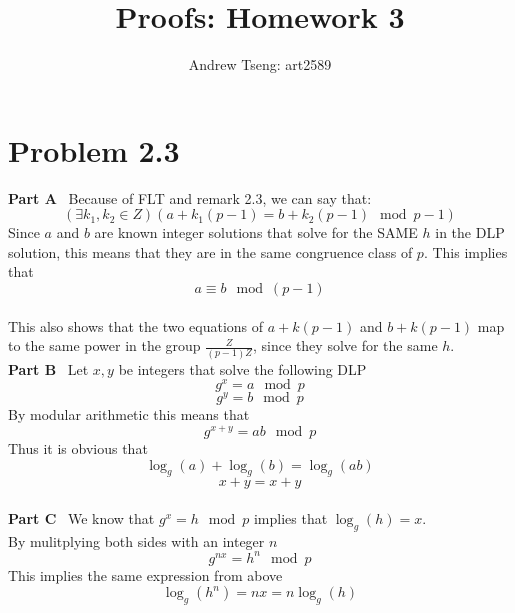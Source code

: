 \documentclass[10pt]{amsart}
\title{Proofs: Homework 3}
\author{Andrew Tseng: art2589}
\begin{document}
\maketitle
\thispagestyle{empty}

\section*{\large \textbf{Problem 2.3}}
\begin{addmargin}{5pt}
\textbf{\small Part A} \
Because of FLT and remark 2.3, we can say that:
\[(\exists k_{1},k_{2} \in Z)(a + k_{1}(p-1) = b + k_{2}(p-1) \mod p-1) \]
Since $a$ and $b$ are known integer solutions that solve for the SAME $h$ in
the DLP solution, this means that they are in the same congruence class of $p$. 
This implies that
\[a \equiv b \mod (p-1)\]
\\
This also shows that the two equations of $a + k(p-1)$ and $b + k(p-1)$ map to
the same power in the group $\frac{Z}{(p-1)Z}$,
since they solve for the same $h$. \\

\noindent \textbf{\small Part B} \
Let $x,y$ be integers that solve the following DLP
\[g^x = a \mod p\]
\[g^y = b \mod p\]
By modular arithmetic this means that
\[g^{x+y} = ab \mod p\]
Thus it is obvious that
\[\log_{g}(a) + \log_{g}(b) = \log_{g}(ab)\]
\[x + y = x + y\] \\

\noindent \textbf{\small Part C} \
We know that $g^x = h \mod p$ implies that $\log_{g}(h) = x$.  \\
By mulitplying both sides with an integer $n$  \\
\noindent \[g^{nx} = h^n \mod p\]
This implies the same expression from above
\[\log_{g}(h^n) = nx = n\log_{g}(h)\]
\\
\end{addmargin}
\end{document}
